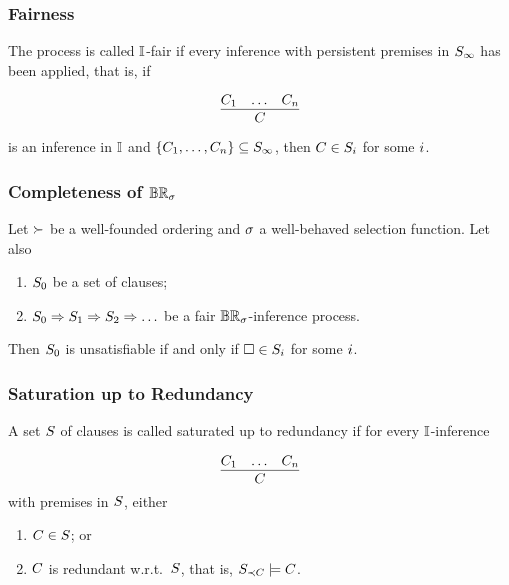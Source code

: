 

                            \begin{frame}\frametitle{Fairness}

The process is called \alert{$\mathbb{I}$-fair} if every inference with persistent
premises in ${S_\infty}$ has been applied, that is, if 

    \[\M{
      \infer{C}{C_1 & \ldots & C_n}}
  \]

  
is an inference in ${\mathbb{I}}$ 
and ${{\{{C_{1},\ldots,C_{n}}\}} \subseteq S_\infty}$,
then ${C \in S_i}$ for some ${i}$.


                                \end{frame}


                    \begin{frame}\frametitle{Completeness of $\mathbb{BR}_{\sigma}$}


\textbf{}
Let ${\succ}$ be a well-founded ordering and ${\sigma}$ a
well-behaved selection function. Let also 
\medskip

\begin{enumerate}
\item ${S_0}$ be a set of clauses;
\item ${S_0 \Rightarrow S_1 \Rightarrow S_2 \Rightarrow \ldots}$ be a fair 
${\mathbb{BR}_{\sigma}}$-inference process.
\end{enumerate}

\bigskip

Then ${S_0}$ is unsatisfiable if and only if ${\Box \in S_i}$
for some ${i}$.

                                \end{frame}



                      \begin{frame}\frametitle{Saturation up to Redundancy}

A set ${S}$ of clauses is called \alert{saturated up to redundancy} if
for every ${\mathbb{I}}$-inference 

    \[\M{
      \infer{C}{C_1 & \ldots & C_n}}
    \]
with premises in ${S}$, either

\begin{enumerate}
\item ${C \in S}$; or

  \medskip
  
\item ${C}$ is redundant w.r.t.\ ${S}$, that is, 
${S_{\prec C} \models C}$.
\end{enumerate}

                                \end{frame}


